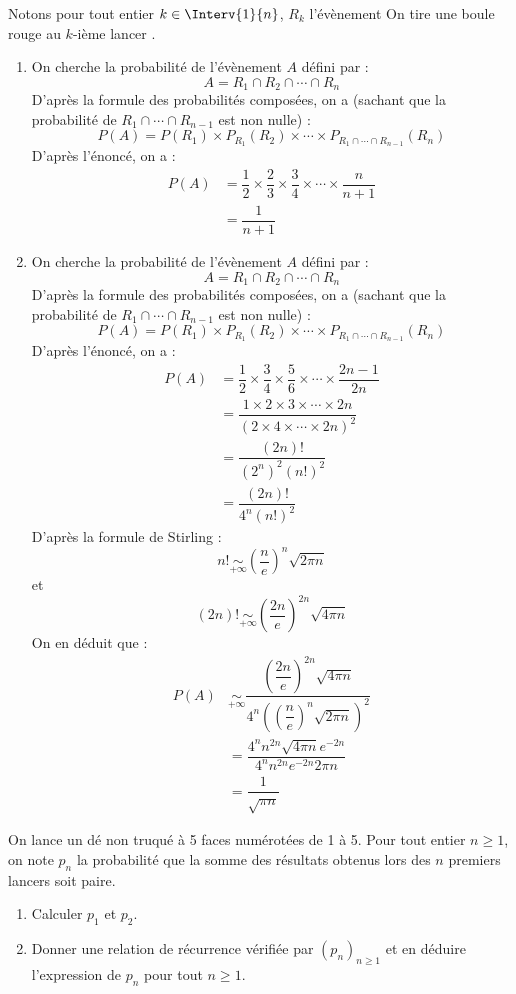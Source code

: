 \documentclass[a4paper,10pt]{report}
\begin{document}
\corr Notons pour tout entier $k \in \Interv{1}{n}$, $R_k$ l'évènement \og On tire une boule rouge au $k$-ième lancer \fg.

\begin{enumerate}
\item On cherche la probabilité de l'évènement $A$ défini par :
$$ A = R_1 \cap R_2 \cap \cdots \cap R_n$$
D'après la formule des probabilités composées, on a (sachant que la probabilité de $R_1 \cap \cdots \cap R_{n-1}$ est non nulle) :
$$ P(A) = P(R_1) \times P_{R_1}(R_2) \times \cdots \times P_{R_1 \cap \cdots \cap R_{n-1}}(R_n)$$
D'après l'énoncé, on a :
\begin{align*}
P(A) & = \dfrac{1}{2} \times \dfrac{2}{3} \times \dfrac{3}{4} \times \cdots \times \dfrac{n}{n+1} \\
& = \dfrac{1}{n+1}
\end{align*}
\item On cherche la probabilité de l'évènement $A$ défini par :
$$ A = R_1 \cap R_2 \cap \cdots \cap R_n$$
D'après la formule des probabilités composées, on a (sachant que la probabilité de $R_1 \cap \cdots \cap R_{n-1}$ est non nulle) :
$$ P(A) = P(R_1) \times P_{R_1}(R_2) \times \cdots \times P_{R_1 \cap \cdots \cap R_{n-1}}(R_n)$$
D'après l'énoncé, on a :
\begin{align*}
P(A) & = \dfrac{1}{2} \times \dfrac{3}{4} \times \dfrac{5}{6} \times \cdots \times \dfrac{2n-1}{2n} \\
& = \dfrac{1 \times 2 \times 3 \times \cdots \times 2n}{(2 \times 4 \times \cdots \times 2n)^2} \\
& = \dfrac{(2n)!}{(2^n)^2 (n!)^2} \\
&= \dfrac{(2n)!}{4^n (n!)^2}
\end{align*}
D'après la formule de Stirling :
$$ n! \underset{+ \infty}{\sim} \left(\dfrac{n}{e} \right)^n \sqrt{2 \pi n}$$
et 
$$ (2n)! \underset{+ \infty}{\sim} \left(\dfrac{2n}{e} \right)^{2n} \sqrt{4 \pi n}$$
On en déduit que :
\begin{align*}
P(A) & \underset{+ \infty}{\sim} \dfrac{\left(\dfrac{2n}{e} \right)^{2n} \sqrt{4 \pi n}}{4^n \left(\left(\dfrac{n}{e} \right)^n \sqrt{2 \pi n}\right)^2} \\
& = \dfrac{4^n n^{2n} \sqrt{4 \pi n} e^{-2n}}{4^n n^{2n} e^{-2n}2\pi n} \\
& = \dfrac{1}{\sqrt{\pi n}}
\end{align*}
\end{enumerate}

\begin{Exa} On lance un dé non truqué à 5 faces numérotées de 1 à 5. Pour tout entier $n \geq 1$, on note $p_n$ la probabilité que la somme des résultats obtenus lors des $n$ premiers lancers soit paire. 
\begin{enumerate}
\item Calculer $p_1$ et $p_2$.
\item Donner une relation de récurrence vérifiée par $(p_n)_{n \geq 1}$ et en déduire l'expression de $p_n$ pour tout $n \geq 1$.
\end{enumerate}
\end{Exa}
\end{document}
